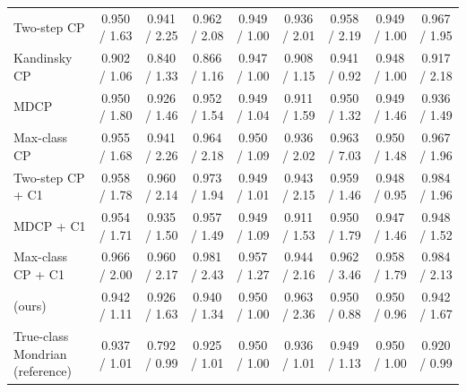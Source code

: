 \begin{table}[t]
{\begin{tabular}{lcccccccc}
Two-step CP & 0.950 / 1.63 & 0.941 / 2.25 & 0.962 / 2.08 & 0.949 / 1.00 & 0.936 / 2.01 & 0.958 / 2.19 & 0.949 / 1.00 & 0.967 / 1.95 \\
Kandinsky CP & 0.902 / 1.06 & 0.840 / 1.33 & 0.866 / 1.16 & 0.947 / 1.00 & 0.908 / 1.15 & 0.941 / 0.92 & 0.948 / 1.00 & 0.917 / 2.18 \\
MDCP & 0.950 / 1.80 & 0.926 / 1.46 & 0.952 / 1.54 & 0.949 / 1.04 & 0.911 / 1.59 & 0.950 / 1.32 & 0.949 / 1.46 & 0.936 / 1.49 \\
Max-class CP & 0.955 / 1.68 & 0.941 / 2.26 & 0.964 / 2.18 & 0.950 / 1.09 & 0.936 / 2.02 & 0.963 / 7.03 & 0.950 / 1.48 & 0.967 / 1.96 \\
Two-step CP + C1 & 0.958 / 1.78 & 0.960 / 2.14 & 0.973 / 1.94 & 0.949 / 1.01 & 0.943 / 2.15 & 0.959 / 1.46 & 0.948 / 0.95 & 0.984 / 1.96 \\
MDCP + C1 & 0.954 / 1.71 & 0.935 / 1.50 & 0.957 / 1.49 & 0.949 / 1.09 & 0.911 / 1.53 & 0.950 / 1.79 & 0.947 / 1.46 & 0.948 / 1.52 \\
Max-class CP + C1 & 0.966 / 2.00 & 0.960 / 2.17 & 0.981 / 2.43 & 0.957 / 1.27 & 0.944 / 2.16 & 0.962 / 3.46 & 0.958 / 1.79 & 0.984 / 2.13 \\
\gamut{} (ours) & 0.942 / 1.11 & 0.926 / 1.63 & 0.940 / 1.34 & 0.950 / 1.00 & 0.963 / 2.36 & 0.950 / 0.88 & 0.950 / 0.96 & 0.942 / 1.67 \\
True-class Mondrian (reference) & 0.937 / 1.01 & 0.792 / 0.99 & 0.925 / 1.01 & 0.950 / 1.00 & 0.936 / 1.01 & 0.949 / 1.13 & 0.950 / 1.00 & 0.920 / 0.99 \\
\bottomrule
\end{tabular}}
\end{table}
